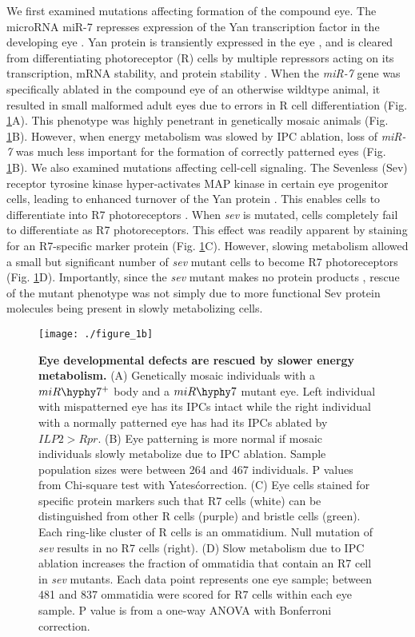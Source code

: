 We first examined mutations affecting formation of the compound eye. The microRNA miR-7 represses expression of the Yan transcription factor in the developing eye \cite{Li2005}. Yan protein is transiently expressed in the eye \cite{Pelaez2015a}, and is cleared from differentiating photoreceptor (R) cells by multiple repressors acting on its transcription, mRNA stability, and protein stability \cite{Graham2010}. When the \textit{miR-7} gene was specifically ablated in the compound eye of an otherwise wildtype animal, it resulted in small malformed adult eyes due to errors in R cell differentiation (Fig. \ref{fig:metabolism:fig1b}A). This phenotype was highly penetrant in genetically mosaic animals (Fig. \ref{fig:metabolism:fig1b}B). However, when energy metabolism was slowed by IPC ablation, loss of \textit{miR-7} was much less important for the formation of correctly patterned eyes (Fig. \ref{fig:metabolism:fig1b}B). We also examined mutations affecting cell-cell signaling. The Sevenless (Sev) receptor tyrosine kinase hyper-activates MAP kinase in certain eye progenitor cells, leading to enhanced turnover of the Yan protein \cite{Rebay1995}. This enables cells to differentiate into R7 photoreceptors \cite{Voas2004}. When \textit{sev} is mutated, cells completely fail to differentiate as R7 photoreceptors. This effect was readily apparent by staining for an R7-specific marker protein (Fig. \ref{fig:metabolism:fig1b}C). However, slowing metabolism allowed a small but significant number of \textit{sev} mutant cells to become R7 photoreceptors (Fig. \ref{fig:metabolism:fig1b}D). Importantly, since the \textit{sev} mutant makes no protein products \cite{Banerjee1987}, rescue of the mutant phenotype was not simply due to more functional Sev protein molecules being present in slowly metabolizing cells.

\begin{figure}[h!]
\centering
\texttt{[image: ./figure\_1b]}
\caption[Eye developmental defects are rescued by slower energy metabolism.]{\textbf{Eye developmental defects are rescued by slower energy metabolism.} (A) Genetically mosaic individuals with a $miR\hyphy 7^+$ body and a $miR\hyphy  7$ mutant eye. Left individual with mispatterned eye has its IPCs intact while the right individual with a normally patterned eye has had its IPCs ablated by $ILP2>Rpr$. (B) Eye patterning is more normal if mosaic individuals slowly metabolize due to IPC ablation. Sample population sizes were between 264 and 467 individuals. P values from Chi-square test with Yates\' correction. (C) Eye cells stained for specific protein markers such that R7 cells (white) can be distinguished from other R cells (purple) and bristle cells (green). Each ring-like cluster of R cells is an ommatidium. Null mutation of \textit{sev} results in no R7 cells (right). (D) Slow metabolism due to IPC ablation increases the fraction of ommatidia that contain an R7 cell in \textit{sev} mutants. Each data point represents one eye sample; between 481 and 837 ommatidia were scored for R7 cells within each eye sample. P value is from a one-way ANOVA with Bonferroni correction.}
\label{fig:metabolism:fig1b}
\end{figure}

